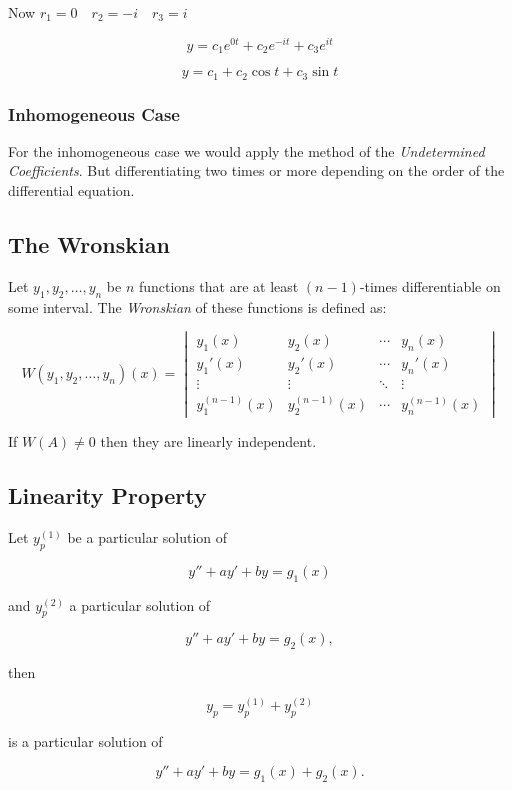 Now \(r_1 = 0 \quad r_2 = -i \quad r_3 = i\)

\[
    y = c_1 e^{0t} + c_2 e^{-it} + c_3 e^{it}
\]

\[
    y = c_1 + c_2 \cos t + c_3 \sin t
\]

\subsubsection{Inhomogeneous Case}

For the inhomogeneous case we would apply the method of the \emph{Undetermined Coefficients}. But 
differentiating two times or more depending on the order of the differential equation.

\subsection{The Wronskian}

Let \( y_1, y_2, \ldots, y_n \) be \( n \) functions that are at least 
\( (n-1) \)-times differentiable on some interval. The \emph{Wronskian} of these 
functions is defined as:

\[
    W(y_1, y_2, \ldots, y_n)(x) =
    \begin{vmatrix}
    y_1(x) & y_2(x) & \cdots & y_n(x) \\
    y_1'(x) & y_2'(x) & \cdots & y_n'(x) \\
    \vdots & \vdots & \ddots & \vdots \\
    y_1^{(n-1)}(x) & y_2^{(n-1)}(x) & \cdots & y_n^{(n-1)}(x)
    \end{vmatrix}
\]

If \(W(A) \ne 0\) then they are linearly independent.


\subsection{Linearity Property}

Let \( y_p^{(1)} \) be a particular solution of  

\[
    y'' + ay' + by = g_1(x)
\]  

and \( y_p^{(2)} \) a particular solution of  

\[
    y'' + ay' + by = g_2(x),
\]  

then  

\[
    y_p = y_p^{(1)} + y_p^{(2)}
\]  

is a particular solution of  

\[
    y'' + ay' + by = g_1(x) + g_2(x).
\]  


